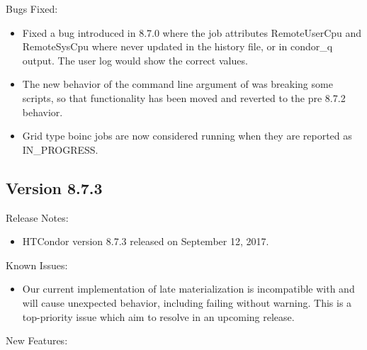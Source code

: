 \noindent Bugs Fixed:

\begin{itemize}

\item Fixed a bug introduced in 8.7.0 where the job attributes RemoteUserCpu
and RemoteSysCpu where never updated in the history file, or in condor\_q
output.  The user log would show the correct values.

\item The new behavior of the  command line argument of  was breaking some
scripts, so that functionality has been moved and  reverted to the pre 8.7.2 behavior.

\item Grid type boinc jobs are now considered running when they are reported as
IN\_PROGRESS.

\end{itemize}

\subsection*{\label{sec:New-8-7-3}Version 8.7.3}

\noindent Release Notes:

\begin{itemize}

\item HTCondor version 8.7.3 released on September 12, 2017.

\end{itemize}

\noindent Known Issues:

\begin{itemize}

\item Our current implementation of late materialization is incompatible with
 and will cause unexpected behavior, including failing without
warning. This is a top-priority issue which aim to resolve in an upcoming
release.

\end{itemize}

\noindent New Features:

